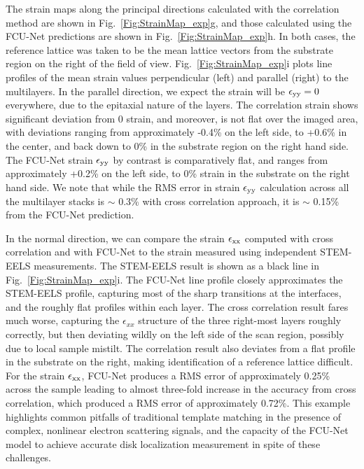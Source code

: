 \documentclass[%
 reprint,
superscriptaddress,
 amsmath,
 amssymb,
 prl,
]{revtex4-2}
\begin{document}
The strain maps along the principal directions calculated with the correlation method are shown in Fig.~\ref{Fig:StrainMap_exp}g, and those calculated using the FCU-Net predictions are shown in Fig.~\ref{Fig:StrainMap_exp}h. In both cases, the reference lattice was taken to be the mean lattice vectors from the substrate region on the right of the field of view. Fig.~\ref{Fig:StrainMap_exp}i plots line profiles of the mean strain values perpendicular (left) and parallel (right) to the multilayers. In the parallel direction, we expect the strain will be $\epsilon_{\rm{yy}}=0$ everywhere, due to the epitaxial nature of the layers. The correlation strain shows significant deviation from 0 strain, and moreover, is not flat over the imaged area, with deviations ranging from approximately -0.4\% on the left side, to +0.6\% in the center, and back down to 0\% in the substrate region on the right hand side. The FCU-Net strain $\epsilon_{\rm{yy}}$ by contrast is comparatively flat, and ranges from approximately +0.2\% on the left side, to 0\% strain in the substrate on the right hand side. We note that while the RMS error in strain $\epsilon_{\rm{yy}}$ calculation across all the multilayer stacks is $\sim$ 0.3\% with cross correlation approach, it is $\sim$ 0.15\% from the FCU-Net prediction.

In the normal direction, we can compare the strain $\epsilon_{\rm{xx}}$ computed with cross correlation and with FCU-Net to the strain measured using independent STEM-EELS measurements.  The STEM-EELS result is shown as a black line in Fig.~\ref{Fig:StrainMap_exp}i.  The FCU-Net line profile closely approximates the STEM-EELS profile, capturing most of the sharp transitions at the interfaces, and the roughly flat profiles within each layer.  The cross correlation result fares much worse, capturing the $\epsilon_{xx}$ structure of the three right-most layers roughly correctly, but then deviating wildly on the left side of the scan region, possibly due to local sample mistilt.  The correlation result also deviates from a flat profile in the substrate on the right, making identification of a reference lattice difficult. For the strain $\epsilon_{\rm{xx}}$, FCU-Net produces a RMS error of approximately 0.25\% across the sample leading to almost three-fold increase in the accuracy from cross correlation, which produced a RMS error of approximately 0.72\%. This example highlights common pitfalls of traditional template matching in the presence of complex, nonlinear electron scattering signals, and the capacity of the FCU-Net model to achieve accurate disk localization measurement in spite of these challenges.
\end{document}

